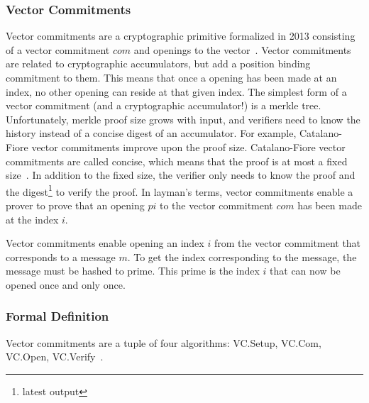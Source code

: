 \subsubsection{Vector Commitments}
Vector commitments are a cryptographic primitive formalized in 2013 consisting of a vector commitment \(com\) and openings to the vector~\cite{Catalano2013-jn}. Vector commitments are related to cryptographic accumulators, but add a position binding commitment to them. This means that once a opening has been made at an index, no other opening can reside at that given index.
The simplest form of a vector commitment (and a cryptographic accumulator!) is a merkle tree. Unfortunately, merkle proof size grows with input, and verifiers need to know the history instead of a concise digest of an accumulator. For example, Catalano-Fiore vector commitments improve upon the proof size. Catalano-Fiore vector commitments are called concise, which means that the proof is at most a fixed size~\cite{Catalano2013-jn}. In addition to the fixed size, the verifier only needs to know the proof and the digest\footnote{latest output} to verify the proof. In layman's terms, vector commitments enable a prover to prove that an opening \(pi\) to the vector commitment \(com\) has been made at the index \(i\).

Vector commitments enable opening an index \(i\) from the vector commitment that corresponds to a message \(m\). To get the index corresponding to the message, the message must be hashed to prime. This prime is the index \(i\) that can now be opened once and only once.

\subsubsection{Formal Definition}
Vector commitments are a tuple of four algorithms: VC.Setup, VC.Com, VC.Open, VC.Verify~\cite{Boneh2019-tk}.

